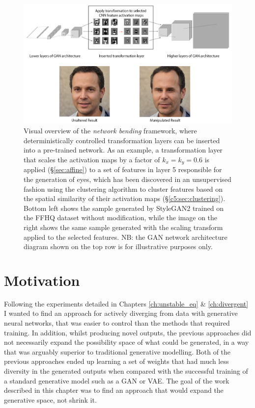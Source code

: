 \begin{figure}[!htb]
    \centering
    \includegraphics[width=1\textwidth]{figures/c5_netbend/misc/network-bending-diagram.png}
    \caption[Visual overview of the \textit{network bending} framework]{Visual overview of the \textit{network bending} framework, where deterministically controlled transformation layers can be inserted into a pre-trained network. As an example, a transformation layer that scales the activation maps by a factor of $k_x=k_y=0.6$ is applied (\S\ref{sec:affine}) to a set of features in layer 5 responsible for the generation of eyes, which has been discovered in an unsupervised fashion using the clustering algorithm to cluster features based on the spatial similarity of their activation maps (\S \ref{c5:sec:clustering}). Bottom left shows the sample generated by StyleGAN2 \citep{karras2019analyzing} trained on the FFHQ dataset without modification, while the image on the right shows the same sample generated with the scaling transform applied to the selected features. NB: the GAN network architecture diagram shown on the top row is for illustrative purposes only.}
    \label{fig:c5:overview_diagram}
\end{figure}

\section{Motivation}

Following the experiments detailed in Chapters \ref{ch:unstable_eq} \& \ref{ch:divergent} I wanted to find an approach for actively diverging from data with generative neural networks, that was easier to control than the methods that required training.
In addition, whilst producing novel outputs, the previous approaches did not necessarily expand the possibility space of what could be generated, in a way that was arguably superior to traditional generative modelling.
Both of the previous approaches ended up learning a set of weights that had much less diversity in the generated outputs when compared with the successful training of a standard generative model such as a GAN or VAE. 
The goal of the work described in this chapter was to find an approach that would expand the generative space, not shrink it. 


